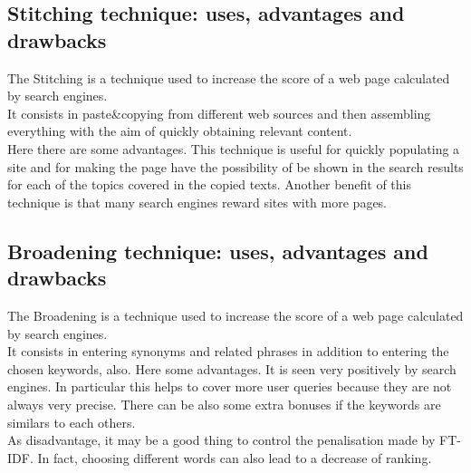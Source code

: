 \subsection{Stitching technique: uses, advantages and drawbacks}
The Stitching is a technique used to increase the score of a web page
calculated by search engines.\\ It consists in paste\&copying from
different web sources and then assembling everything with the aim
of quickly obtaining relevant content.\\
Here there are some advantages. This technique is useful for quickly
populating a site and for making the page have the possibility of be
shown in the search results for each of the topics covered in the copied
texts. Another benefit of this technique is that many search engines
reward sites with more pages.

\subsection{Broadening technique: uses, advantages and drawbacks}
The Broadening is a technique used to increase the score of a web page
calculated by search engines.\\
It consists in entering synonyms and related phrases in addition to
entering the chosen keywords, also.
Here some advantages. It is seen very
positively by search engines.
In particular this helps to cover more user queries because they are
not always very precise. There can be also some extra bonuses if the
keywords are similars to each others.\\
As disadvantage, it may be a good thing to control the penalisation made
by FT-IDF. In fact, choosing different words can also lead to a decrease of
ranking.

